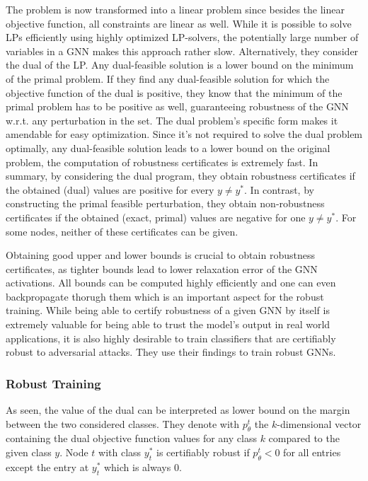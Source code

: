 \documentclass[a4paper,preprint]{sig-alternate}
\begin{document}
\vfill
\pagebreak

The problem is now transformed into a linear problem since besides the linear objective function, all constraints are linear as well.
While it is possible to solve LPs efficiently using highly optimized LP-solvers, the potentially large number of variables in a GNN
makes this approach rather slow. Alternatively, they consider the dual of the LP. Any dual-feasible solution 
is a lower bound on the minimum of the primal problem. If they find any dual-feasible solution for which the objective function of the dual is positive,
they know that the minimum of the primal problem has to be positive as well, guaranteeing robustness of the GNN w.r.t. any perturbation in the set.
The dual problem's specific form makes it amendable for easy optimization. Since it's not required to solve the dual problem optimally, 
any dual-feasible solution leads to a lower bound on the original problem, the computation of robustness certificates is extremely fast.
In summary, by considering the dual program, they obtain robustness certificates if the obtained (dual) values are positive for every $y \neq y^*$.
In contrast, by constructing the primal feasible perturbation, they obtain non-robustness certificates if the obtained (exact, primal) values
are negative for one $y \neq y^*$. For some nodes, neither of these certificates can be given.\newline

Obtaining good upper and lower bounds is crucial to obtain robustness certificates, as tighter bounds lead to lower relaxation error of the GNN activations. 
All bounds can be computed highly efficiently and one can even backpropagate thorugh them which is an important aspect for the robust training.
While being able to certify robustness of a given GNN by itself is extremely valuable for being able to trust the model's output in real world
applications, it is also highly desirable to train classifiers that are certifiably robust to adversarial attacks.
They use their findings to train robust GNNs.\newline

\subsubsection{Robust Training}

As seen, the value of the dual can be interpreted as lower bound on the margin between the two considered classes.
They denote with $p_{\theta}^t$ the $k$-dimensional vector containing the dual objective function values
for any class $k$ compared to the given class $y$. Node $t$ with class $y_t^{\ast}$ is certifiably robust if $p_{\theta}^t < 0$ for all entries
except the entry at $y_t^{\ast}$ which is always $0$.\newline
\end{document}
